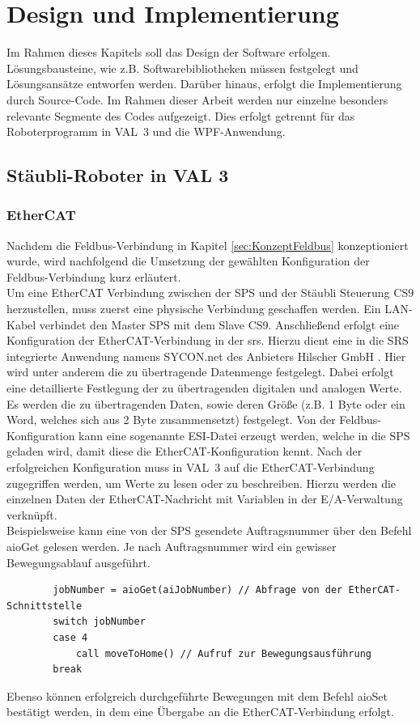 \documentclass[ a4paper,
                oneside,
                toc=bibliography,
                toc=listof
                ]{scrbook}
\begin{document}
	
	
	
	\chapter{Design und Implementierung}
	Im Rahmen dieses Kapitels soll das Design der Software erfolgen. Lösungsbausteine, wie z.B. Softwarebibliotheken müssen festgelegt und Lösungsansätze entworfen werden. Darüber hinaus, erfolgt die Implementierung durch Source-Code. Im Rahmen dieser Arbeit werden nur einzelne besonders relevante Segmente des Codes aufgezeigt. Dies erfolgt getrennt für das Roboterprogramm in VAL~3 und die WPF-Anwendung.
	\section{Stäubli-Roboter in VAL 3}
	
	\subsection{EtherCAT}
	Nachdem die Feldbus-Verbindung in Kapitel \ref{sec:KonzeptFeldbus} konzeptioniert wurde, wird nachfolgend die Umsetzung der gewählten Konfiguration der Feldbus-Verbindung kurz erläutert.\\
	Um eine EtherCAT Verbindung zwischen der SPS und der Stäubli Steuerung CS9 herzustellen, muss zuerst eine physische Verbindung geschaffen werden. Ein LAN-Kabel verbindet den Master SPS mit dem Slave CS9. Anschließend erfolgt eine Konfiguration der EtherCAT-Verbindung in der \acl{srs}. Hierzu dient eine in die SRS integrierte Anwendung namens \glqq SYCON.net \grqq{} des Anbieters \glqq Hilscher GmbH \grqq. Hier wird unter anderem die zu übertragende Datenmenge festgelegt. Dabei erfolgt eine detaillierte Festlegung der zu übertragenden digitalen und analogen Werte. Es werden die zu übertragenden Daten, sowie deren Größe (z.B. 1 Byte oder ein Word, welches sich aus 2 Byte zusammensetzt) festgelegt. Von der Feldbus-Konfiguration kann eine sogenannte ESI-Datei erzeugt werden, welche in die SPS geladen wird, damit diese die EtherCAT-Konfiguration kennt. Nach der erfolgreichen Konfiguration muss in VAL~3 auf die EtherCAT-Verbindung zugegriffen werden, um Werte zu lesen oder zu beschreiben. Hierzu werden die einzelnen Daten der EtherCAT-Nachricht mit Variablen in der E/A-Verwaltung verknüpft. \cite{CS9} \cite{CS9_Fieldbus}\\
	Beispielsweise kann eine von der SPS gesendete Auftragsnummer über den Befehl \glqq aioGet\grqq{} gelesen werden. Je nach Auftragsnummer wird ein gewisser Bewegungsablauf ausgeführt.
	\begin{lstlisting}
		jobNumber = aioGet(aiJobNumber) // Abfrage von der EtherCAT-Schnittstelle
		switch jobNumber
		case 4
			call moveToHome() // Aufruf zur Bewegungsausführung
		break
	\end{lstlisting}
	Ebenso können erfolgreich durchgeführte Bewegungen mit dem Befehl \glqq aioSet\grqq{} bestätigt werden, in dem eine Übergabe an die EtherCAT-Verbindung erfolgt. \cite{VAL3} 
	
\end{document}
